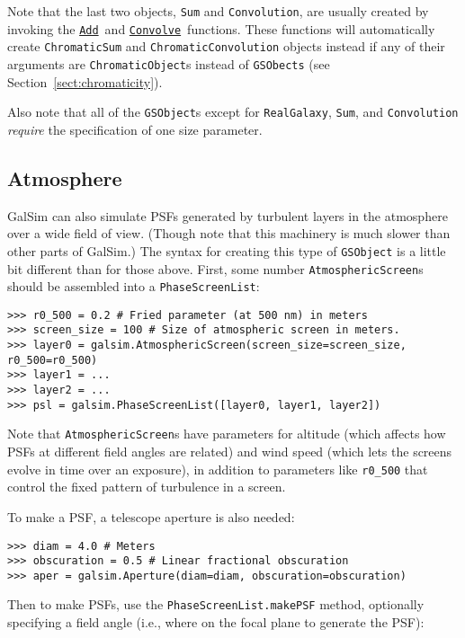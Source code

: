 \documentclass[preprint,10pt]{../../devel/modules/aastex}
\newcommand\Add{\href{http://galsim-developers.github.io/GalSim/namespacegalsim_1_1compound.html\#ad3f305087db1b740376666d9c022d94e}{\texttt{Add}}}
\newcommand\Convolve{\href{http://galsim-developers.github.io/GalSim/namespacegalsim_1_1compound.html\#a17ccb8acb75a4eb6e35e791e4177957b}{\texttt{Convolve}}}
\begin{document}
Note that the last two objects, \texttt{Sum} and \texttt{Convolution}, are usually created by
invoking the \Add\ and \Convolve\ functions.  These functions will
automatically create \texttt{ChromaticSum} and \texttt{ChromaticConvolution} objects instead if
any of their arguments are \texttt{ChromaticObject}s instead of
\texttt{GSObects} (see Section~\ref{sect:chromaticity}).

Also note that all of the \texttt{GSObject}s except for \texttt{RealGalaxy}, \texttt{Sum}, and
\texttt{Convolution} {\em require} the specification of one size
parameter.

\subsection{Atmosphere}
GalSim can also simulate PSFs generated by turbulent layers in the atmosphere over a wide field of
view.  (Though note that this machinery is much slower than other parts of GalSim.) The syntax for
creating this type of \texttt{GSObject} is a little bit different than for those above.  First, some
number \texttt{AtmosphericScreen}s should be assembled into a \texttt{PhaseScreenList}:

\begin{verbatim}
>>> r0_500 = 0.2 # Fried parameter (at 500 nm) in meters
>>> screen_size = 100 # Size of atmospheric screen in meters.
>>> layer0 = galsim.AtmosphericScreen(screen_size=screen_size, r0_500=r0_500)
>>> layer1 = ...
>>> layer2 = ...
>>> psl = galsim.PhaseScreenList([layer0, layer1, layer2])
\end{verbatim}

Note that \texttt{AtmosphericScreen}s have parameters for altitude (which affects how PSFs at
different field angles are related) and wind speed (which lets the screens evolve in time over an
exposure), in addition to parameters like \texttt{r0\_500} that control the fixed pattern of
turbulence in a screen.

To make a PSF, a telescope aperture is also needed:

\begin{verbatim}
>>> diam = 4.0 # Meters
>>> obscuration = 0.5 # Linear fractional obscuration
>>> aper = galsim.Aperture(diam=diam, obscuration=obscuration)
\end{verbatim}

Then to make PSFs, use the \texttt{PhaseScreenList.makePSF} method, optionally specifying a field
angle (i.e., where on the focal plane to generate the PSF):
\end{document}
